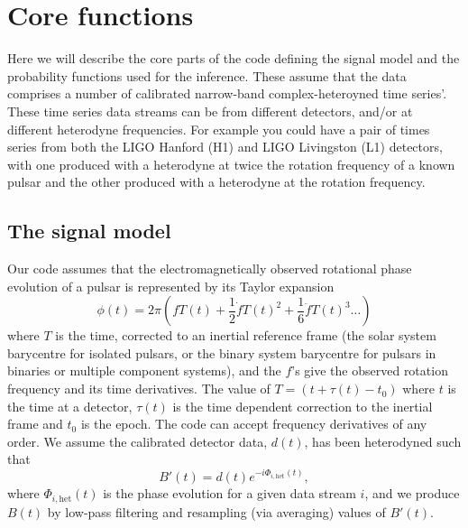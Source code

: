 \section{Core functions}

Here we will describe the core parts of the code defining the signal model and the probability functions used
for the inference. These assume that the data comprises a number of calibrated narrow-band complex-heteroyned time
series'. These time series data streams can be from different detectors, and/or at different heterodyne
frequencies. For example you could have a pair of times series from both the LIGO Hanford (H1) and LIGO
Livingston (L1) detectors, with one produced with a heterodyne at twice the rotation frequency of a known
pulsar and the other produced with a heterodyne at the rotation frequency.

\subsection{The signal model}\label{sec:model}

Our code assumes that the electromagnetically observed rotational phase evolution of a pulsar is represented by its Taylor expansion
\begin{equation}
\phi(t) = 2\pi\left(fT(t) + \frac{1}{2}\dot{f}T(t)^2 + \frac{1}{6}\ddot{f}T(t)^3 \ldots \right)
\end{equation}
where $T$ is the time, corrected to an inertial reference frame (the solar system barycentre
for isolated pulsars, or the binary system barycentre for pulsars in binaries or multiple component systems), and the $f$'s give
the observed rotation frequency and its time derivatives. The value of $T = (t+\tau(t)-t_0)$ where $t$ is the
time at a detector, $\tau(t)$ is the time dependent correction to the inertial frame and $t_0$ is the epoch.
The code can accept frequency derivatives of any order. We assume the
calibrated detector data, $d(t)$, has been heterodyned such that
\begin{equation}
B'(t) = d(t)e^{-i\Phi_{i,\text{het}}(t)},
\end{equation}
where $\Phi_{i,\text{het}}(t)$ is the phase evolution for a given data stream $i$, and we produce $B(t)$ by
low-pass filtering and resampling (via averaging) values of $B'(t)$.

